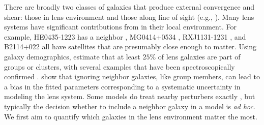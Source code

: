 There are broadly two classes of galaxies that produce external convergence and shear: those in lens environment and those along line of sight (e.g., \citealt{Jaroszynski14,Seljak94,Bar-Kana96,Keeton97}). Many lens systems have significant contributions from in their local environment. For example, HE0435-1223 has a neighbor \citep{Kochanek06}, MG0414+0534 \citep{Tonry99}, RXJ1131-1231 \citep{Sluse03}, and B2114+022 \citep{King99} all have satellites that are presumably close enough to matter. Using galaxy demographics, \citet{Keeton00} estimate that at least $25\%$ of lens galaxies are part of groups or clusters, with several examples that have been spectroscopically confirmed \citep[][and references therein]{Momcheva06}. \citet{Keeton04} show that ignoring neighbor galaxies, like group members, can lead to a bias in the fitted  parameters corresponding to a systematic uncertainty in modeling the lens system. Some models do treat nearby perturbers exactly \citep[e.g.][]{Fadely12}, but typically the decision whether to include a neighbor galaxy in a model is \textit{ad hoc}. We first aim to quantify which galaxies in the lens environment matter the most.
